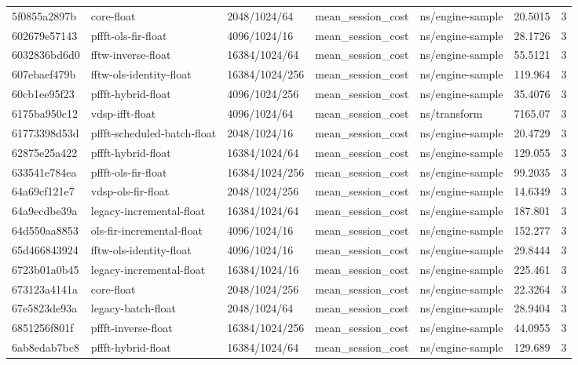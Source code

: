 \begin{longtable}{lllllrr}
5f0855a2897b & core-float & 2048/1024/64 & mean\_session\_cost & ns/engine-sample & 20.5015 & 3 \\
602679e57143 & pffft-ols-fir-float & 4096/1024/16 & mean\_session\_cost & ns/engine-sample & 28.1726 & 3 \\
6032836bd6d0 & fftw-inverse-float & 16384/1024/64 & mean\_session\_cost & ns/engine-sample & 55.5121 & 3 \\
607ebaef479b & fftw-ols-identity-float & 16384/1024/256 & mean\_session\_cost & ns/engine-sample & 119.964 & 3 \\
60cb1ee95f23 & pffft-hybrid-float & 4096/1024/256 & mean\_session\_cost & ns/engine-sample & 35.4076 & 3 \\
6175ba950c12 & vdsp-ifft-float & 4096/1024/64 & mean\_session\_cost & ns/transform & 7165.07 & 3 \\
61773398d53d & pffft-scheduled-batch-float & 2048/1024/16 & mean\_session\_cost & ns/engine-sample & 20.4729 & 3 \\
62875e25a422 & pffft-hybrid-float & 16384/1024/64 & mean\_session\_cost & ns/engine-sample & 129.055 & 3 \\
633541e784ea & pffft-ols-fir-float & 16384/1024/256 & mean\_session\_cost & ns/engine-sample & 99.2035 & 3 \\
64a69cf121e7 & vdsp-ols-fir-float & 2048/1024/256 & mean\_session\_cost & ns/engine-sample & 14.6349 & 3 \\
64a9ecdbe39a & legacy-incremental-float & 16384/1024/64 & mean\_session\_cost & ns/engine-sample & 187.801 & 3 \\
64d550aa8853 & ols-fir-incremental-float & 4096/1024/16 & mean\_session\_cost & ns/engine-sample & 152.277 & 3 \\
65d466843924 & fftw-ols-identity-float & 4096/1024/16 & mean\_session\_cost & ns/engine-sample & 29.8444 & 3 \\
6723b01a0b45 & legacy-incremental-float & 16384/1024/16 & mean\_session\_cost & ns/engine-sample & 225.461 & 3 \\
673123a4141a & core-float & 2048/1024/256 & mean\_session\_cost & ns/engine-sample & 22.3264 & 3 \\
67e5823de93a & legacy-batch-float & 2048/1024/64 & mean\_session\_cost & ns/engine-sample & 28.9404 & 3 \\
6851256f801f & pffft-inverse-float & 16384/1024/256 & mean\_session\_cost & ns/engine-sample & 44.0955 & 3 \\
6ab8edab7bc8 & pffft-hybrid-float & 16384/1024/64 & mean\_session\_cost & ns/engine-sample & 129.689 & 3 \\

\end{longtable}
